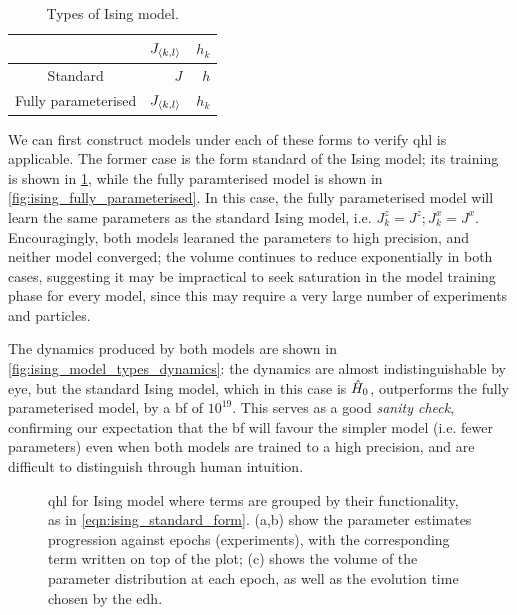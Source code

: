 \begin{table}
    \begin{center}
        \begin{tabular}{crr}
             & $J_{{ \langle k, l \rangle }}$  & $h_{k}$ \\
            \hline
            Standard & $J$ & $h$ \\
            Fully parameterised & $J_{{ \langle k, l \rangle }}$ & $h_{k}$
        \end{tabular}
    \end{center}
    \caption[Types of Ising model]{Types of Ising model.}
    \label{table:ising_models}
\end{table}

\par 

We can first construct models under each of these forms to verify \gls{qhl} is applicable. 
The former case is the form standard of the Ising model; its training is shown in \cref{fig:ising_two_param_learning}, 
    while the fully paramterised model is shown in \cref{fig:ising_fully_parameterised}. 
In this case, the fully parameterised model will learn the same parameters as the standard Ising model,
    i.e. $J^{z}_{k} = J^z; J^x_k = J^x$. 
Encouragingly, both models learaned the parameters to high precision, and neither model converged; 
    the \gls{volume} continues to reduce exponentially in both cases, 
    suggesting it may be impractical to seek saturation in the model training phase for every model, 
    since this may require a very large number of experiments and particles. 
\par 

The dynamics produced by both models are shown in \cref{fig:ising_model_types_dynamics}:
    the dynamics are almost indistinguishable by eye, but the standard Ising model, 
    which in this case is $\hat{H}_0$, outperforms the fully parameterised model, 
    by a \gls{bf} of $10^{19}$.
This serves as a good \emph{sanity check}, confirming our expectation that 
    the \gls{bf} will favour the simpler model (i.e. fewer parameters) even when both models 
    are trained to a high precision, and are difficult to distinguish through human intuition. 


\begin{figure}
    \begin{center}
    \end{center}

    \caption[\gls{qhl} for Ising model]{
        \gls{qhl} for Ising model where terms are grouped by their functionality, 
        as in \cref{eqn:ising_standard_form}. 
        (a,b) show the parameter estimates progression against 
        epochs (experiments), with the corresponding term written on top of the plot; 
        (c) shows the \gls{volume} of the parameter distribution at each epoch, as well as the 
        evolution time chosen by the \gls{edh}. 
        \figtableref
    }
    \label{fig:ising_two_param_learning}
\end{figure}

